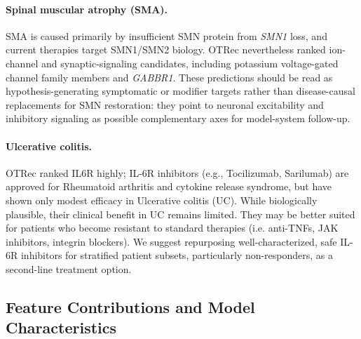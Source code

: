 \documentclass{article}
\begin{document}
\paragraph{Spinal muscular atrophy (SMA).}
SMA is caused primarily by insufficient SMN protein from \textit{SMN1}
loss, and current therapies target SMN1/SMN2 biology.
OTRec nevertheless ranked ion-channel and synaptic-signaling candidates,
including potassium voltage-gated channel family members and
\textit{GABBR1}.
These predictions should be read as hypothesis-generating symptomatic
or modifier targets rather than disease-causal replacements for SMN
restoration: they point to neuronal excitability and inhibitory
signaling as possible complementary axes for model-system follow-up.

\paragraph{Ulcerative colitis.}
OTRec ranked IL6R highly; IL-6R inhibitors (e.g.,  Tocilizumab, Sarilumab) are approved for Rheumatoid arthritis and cytokine release syndrome, but have shown only modest efficacy in Ulcerative colitis (UC). While biologically plausible, their clinical benefit in UC remains limited. They may be better suited for patients who become resistant to standard therapies (i.e. anti-TNFs, JAK inhibitors, integrin blockers). We suggest repurposing well-characterized, safe IL-6R inhibitors for stratified patient subsets, particularly non-responders, as a second-line treatment option. %

\subsection{Feature Contributions and Model Characteristics}
\label{sec:char}
\end{document}
